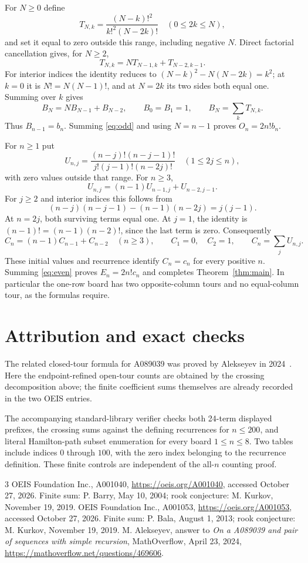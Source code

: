 \documentclass[10pt]{article}
\begin{document}
For $N\ge0$ define
\[
 T_{N,k}=\frac{(N-k)!^2}{k!^2(N-2k)!}
 \quad(0\le2k\le N),
\]
and set it equal to zero outside this range, including negative $N$. Direct factorial cancellation gives, for $N\ge2$,
\[
 T_{N,k}=N T_{N-1,k}+T_{N-2,k-1}.
\]
For interior indices the identity reduces to
$(N-k)^2-N(N-2k)=k^2$; at $k=0$ it is $N!=N(N-1)!$, and at $N=2k$ its two sides both equal one. Summing over $k$ gives
\[
 B_N=NB_{N-1}+B_{N-2},\qquad B_0=B_1=1,
 \qquad B_N=\sum_k T_{N,k}.
\]
Thus $B_{n-1}=b_n$. Summing \eqref{eq:odd} and using $N=n-1$ proves $O_n=2n!b_n$.

For $n\ge1$ put
\[
 U_{n,j}=\frac{(n-j)!(n-j-1)!}{j!(j-1)!(n-2j)!}
 \quad(1\le2j\le n),
\]
with zero values outside that range. For $n\ge3$,
\[
 U_{n,j}=(n-1)U_{n-1,j}+U_{n-2,j-1}.
\]
For $j\ge2$ and interior indices this follows from
\[
 (n-j)(n-j-1)-(n-1)(n-2j)=j(j-1).
\]
At $n=2j$, both surviving terms equal one. At $j=1$, the identity is $(n-1)!=(n-1)(n-2)!$, since the last term is zero. Consequently
\[
 C_n=(n-1)C_{n-1}+C_{n-2}\quad(n\ge3),\qquad
 C_1=0,\quad C_2=1,\qquad C_n=\sum_jU_{n,j}.
\]
These initial values and recurrence identify $C_n=c_n$ for every positive $n$. Summing \eqref{eq:even} proves $E_n=2n!c_n$ and completes Theorem~\ref{thm:main}. In particular the one-row board has two opposite-column tours and no equal-column tour, as the formulas require.

\section{Attribution and exact checks}
The related closed-tour formula for A089039 was proved by Alekseyev in 2024~\cite{mo}. Here the endpoint-refined open-tour counts are obtained by the crossing decomposition above; the finite coefficient sums themselves are already recorded in the two OEIS entries.

The accompanying standard-library verifier checks both 24-term displayed prefixes, the crossing sums against the defining recurrences for $n\le200$, and literal Hamilton-path subset enumeration for every board $1\le n\le8$. Two tables include indices $0$ through $100$, with the zero index belonging to the recurrence definition. These finite controls are independent of the all-$n$ counting proof.

\begin{thebibliography}{3}
 OEIS Foundation Inc., A001040, \url{https://oeis.org/A001040}, accessed October 27, 2026. Finite sum: P. Barry, May 10, 2004; rook conjecture: M. Kurkov, November 19, 2019.
 OEIS Foundation Inc., A001053, \url{https://oeis.org/A001053}, accessed October 27, 2026. Finite sum: P. Bala, August 1, 2013; rook conjecture: M. Kurkov, November 19, 2019.
 M. Alekseyev, answer to \emph{On a A089039 and pair of sequences with simple recursion}, MathOverflow, April 23, 2024, \url{https://mathoverflow.net/questions/469606}.
\end{thebibliography}
\end{document}
